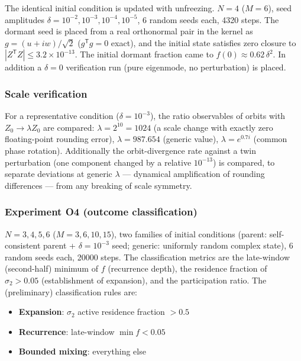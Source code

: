 \documentclass[
  a4paper,
]{article}
\providecommand{\tightlist}{%
  \setlength{\itemsep}{0pt}\setlength{\parskip}{0pt}}
\begin{document}
The identical initial condition is updated with unfreezing. \(N=4\)
(\(M=6\)), seed amplitudes \(\delta=10^{-2},10^{-3},10^{-4},10^{-5}\), 6
random seeds each, 4320 steps. The dormant seed is placed from a real
orthonormal pair in the kernel as \(g=(u+iw)/\sqrt2\)
(\(g^{\mathsf T}g=0\) exact), and the initial state satisfies zero
closure to \(|Z^{\mathsf T}Z|\le3.2\times10^{-13}\). The initial dormant
fraction came to \(f(0)\approx0.62\,\delta^2\). In addition a
\(\delta=0\) verification run (pure eigenmode, no perturbation) is
placed.

\subsubsection{Scale verification}\label{scale-verification}

For a representative condition (\(\delta=10^{-3}\)), the ratio
observables of orbits with \(Z_0\to\lambda Z_0\) are compared:
\(\lambda=2^{10}=1024\) (a scale change with exactly zero floating-point
rounding error), \(\lambda=987.654\) (generic value),
\(\lambda=e^{0.7i}\) (common phase rotation). Additionally the
orbit-divergence rate against a twin perturbation (one component changed
by a relative \(10^{-13}\)) is compared, to separate deviations at
generic \(\lambda\) --- dynamical amplification of rounding differences
--- from any breaking of scale symmetry.

\subsubsection{Experiment O4 (outcome
classification)}\label{experiment-o4-outcome-classification}

\(N=3,4,5,6\) (\(M=3,6,10,15\)), two families of initial conditions
(parent: self-consistent parent + \(\delta=10^{-3}\) seed; generic:
uniformly random complex state), 6 random seeds each, 20000 steps. The
classification metrics are the late-window (second-half) minimum of
\(f\) (recurrence depth), the residence fraction of \(\sigma_2>0.05\)
(establishment of expansion), and the participation ratio. The
(preliminary) classification rules are:

\begin{itemize}
\tightlist
\item
  \textbf{Expansion}: \(\sigma_2\) active residence fraction \(>0.5\)
\item
  \textbf{Recurrence}: late-window \(\min f<0.05\)
\item
  \textbf{Bounded mixing}: everything else
\end{itemize}
\end{document}
